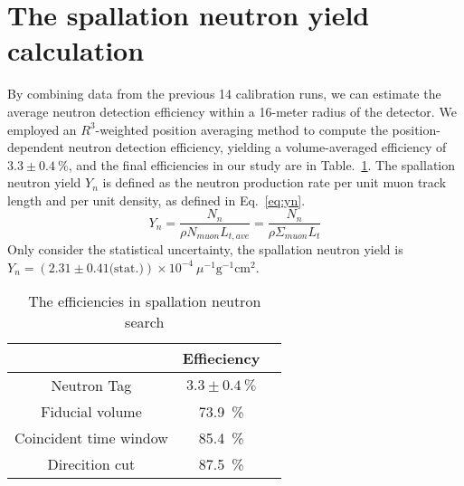 \section{The spallation neutron yield calculation}
By combining data from the previous 14 calibration runs, we can estimate the average neutron detection efficiency within a 16-meter radius of the detector. We employed an $R^3$-weighted position averaging method to compute the position-dependent neutron detection efficiency, yielding a volume-averaged efficiency of $3.3\pm\SI{0.4}{\%}$, and the final efficiencies in our study are in Table.~\ref{tab:spn_eff}.
The spallation neutron yield $Y_n$ is defined as the neutron production rate per unit muon track length and per unit density, as defined in Eq.~\eqref{eq:yn}.
\begin{equation}
	\label{eq:yn}
	Y_n = \frac{N_n}{\rho N_{muon}L_{t,ave}}= \frac{N_n}{\rho \Sigma_{muon} L_t}
\end{equation}
Only consider the statistical uncertainty, the spallation neutron yield is $Y_n = (2.31\pm0.41 \text{(stat.)})\times 10^{-4}~\mu^{-1}\text{g}^{-1}\text{cm}^2$.
\begin{table}[H]
	\caption{The efficiencies in spallation neutron search}%
	\label{tab:spn_eff}
	\centering%
	\begin{tabular}{ccc}
		\toprule%
		                       & Effieciency          \\
		\midrule%
		Neutron Tag            & $3.3\pm\SI{0.4}{\%}$ \\
		Fiducial volume        & \SI{73.9}{\%}        \\
		Coincident time window & \SI{85.4}{\%}        \\
		Direcition cut         & \SI{87.5}{\%}        \\
		\bottomrule
	\end{tabular}
\end{table}


